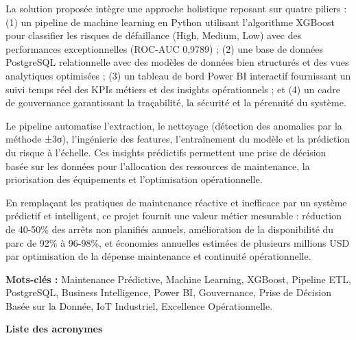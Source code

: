 \documentclass[a4paper,12pt,twoside]{report}
\begin{document}
La solution proposée intègre une approche holistique reposant sur quatre piliers : (1) un pipeline de machine learning en Python utilisant l'algorithme XGBoost pour classifier les risques de défaillance (High, Medium, Low) avec des performances exceptionnelles (ROC-AUC 0,9789) ; (2) une base de données PostgreSQL relationnelle avec des modèles de données bien structurés et des vues analytiques optimisées ; (3) un tableau de bord Power BI interactif fournissant un suivi temps réel des KPIs métiers et des insights opérationnels ; et (4) un cadre de gouvernance garantissant la traçabilité, la sécurité et la pérennité du système.

Le pipeline automatise l'extraction, le nettoyage (détection des anomalies par la méthode ±3σ), l'ingénierie des features, l'entraînement du modèle et la prédiction du risque à l'échelle. Ces insights prédictifs permettent une prise de décision basée sur les données pour l'allocation des ressources de maintenance, la priorisation des équipements et l'optimisation opérationnelle.

En remplaçant les pratiques de maintenance réactive et inefficace par un système prédictif et intelligent, ce projet fournit une valeur métier mesurable : réduction de 40-50\% des arrêts non planifiés annuels, amélioration de la disponibilité du parc de 92\% à 96-98\%, et économies annuelles estimées de plusieurs millions USD par optimisation de la dépense maintenance et continuité opérationnelle.

\textbf{Mots-clés :} Maintenance Prédictive, Machine Learning, XGBoost, Pipeline ETL, PostgreSQL, Business Intelligence, Power BI, Gouvernance, Prise de Décision Basée sur la Donnée, IoT Industriel, Excellence Opérationnelle.

\newpage
\thispagestyle{empty}
\begin{center}
\Large\textbf{Liste des acronymes}
\end{center}

\vspace{2cm}
\end{document}
